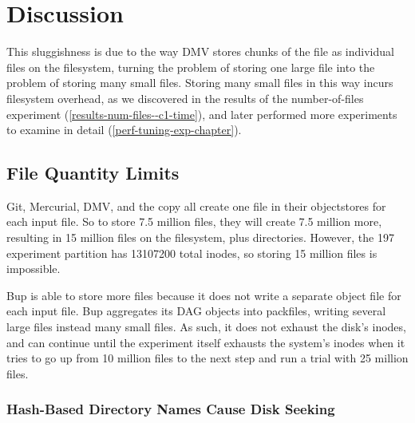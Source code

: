 \section{Discussion}




This sluggishness is due to the way DMV stores chunks of the file as individual files on the filesystem, turning the problem of storing one large file into the problem of storing many small files.
Storing many small files in this way incurs filesystem overhead, as we discovered in the results of the number-of-files experiment (\autoref{results-num-files--c1-time}), and later performed more experiments to examine in detail (\autoref{perf-tuning-exp-chapter}).

\subsection{File Quantity Limits}

Git, Mercurial, DMV, and the copy all create one file in their \glspl{objectstore} for each input file.
So to store \num{7.5} million files, they will create \num{7.5} million more, resulting in \num{15} million files on the filesystem, plus directories.
However, the \SI{197}{\gib} experiment partition has \num{13107200} total \glspl{inode}, so storing \num{15} million files is impossible.

Bup is able to store more files because it does not write a separate object file for each input file.
Bup aggregates its DAG objects into \glspl{packfile}, writing several large files instead many small files.
As such, it does not exhaust the disk's \glspl{inode}, and can continue until the experiment itself exhausts the system's \glspl{inode} when it tries to go up from \num{10} million files to the next step and run a trial with \num{25} million files.

\subsubsection{Hash-Based Directory Names Cause Disk Seeking}

